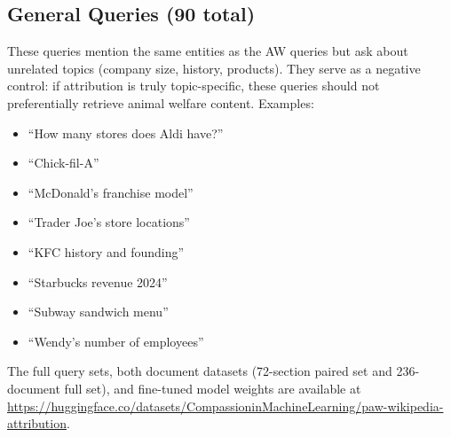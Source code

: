 \documentclass{article}
\begin{document}
\subsection{General Queries (90 total)}

These queries mention the same entities as the AW queries but ask about unrelated topics (company size, history, products). They serve as a negative control: if attribution is truly topic-specific, these queries should not preferentially retrieve animal welfare content. Examples:

\begin{itemize}
    \item ``How many stores does Aldi have?''
    \item ``Chick-fil-A''
    \item ``McDonald's franchise model''
    \item ``Trader Joe's store locations''
    \item ``KFC history and founding''
    \item ``Starbucks revenue 2024''
    \item ``Subway sandwich menu''
    \item ``Wendy's number of employees''
\end{itemize}

The full query sets, both document datasets (72-section paired set and 236-document full set), and fine-tuned model weights are available at \url{https://huggingface.co/datasets/CompassioninMachineLearning/paw-wikipedia-attribution}.
\end{document}
